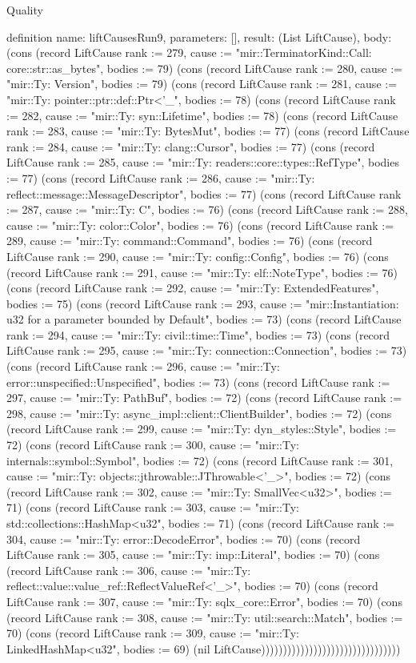\begin{lexlean}{Quality}
\begin{semanticmodule}
definition{
  name: liftCausesRun9,
  parameters: [],
  result: (List LiftCause),
  body: (cons (record LiftCause {rank := 279, cause := "mir::TerminatorKind::Call: core::str::as_bytes", bodies := 79}) (cons (record LiftCause {rank := 280, cause := "mir::Ty: Version", bodies := 79}) (cons (record LiftCause {rank := 281, cause := "mir::Ty: pointer::ptr::def::Ptr<'_", bodies := 78}) (cons (record LiftCause {rank := 282, cause := "mir::Ty: syn::Lifetime", bodies := 78}) (cons (record LiftCause {rank := 283, cause := "mir::Ty: BytesMut", bodies := 77}) (cons (record LiftCause {rank := 284, cause := "mir::Ty: clang::Cursor", bodies := 77}) (cons (record LiftCause {rank := 285, cause := "mir::Ty: readers::core::types::RefType", bodies := 77}) (cons (record LiftCause {rank := 286, cause := "mir::Ty: reflect::message::MessageDescriptor", bodies := 77}) (cons (record LiftCause {rank := 287, cause := "mir::Ty: C", bodies := 76}) (cons (record LiftCause {rank := 288, cause := "mir::Ty: color::Color", bodies := 76}) (cons (record LiftCause {rank := 289, cause := "mir::Ty: command::Command", bodies := 76}) (cons (record LiftCause {rank := 290, cause := "mir::Ty: config::Config", bodies := 76}) (cons (record LiftCause {rank := 291, cause := "mir::Ty: elf::NoteType", bodies := 76}) (cons (record LiftCause {rank := 292, cause := "mir::Ty: ExtendedFeatures", bodies := 75}) (cons (record LiftCause {rank := 293, cause := "mir::Instantiation: u32 for a parameter bounded by Default", bodies := 73}) (cons (record LiftCause {rank := 294, cause := "mir::Ty: civil::time::Time", bodies := 73}) (cons (record LiftCause {rank := 295, cause := "mir::Ty: connection::Connection", bodies := 73}) (cons (record LiftCause {rank := 296, cause := "mir::Ty: error::unspecified::Unspecified", bodies := 73}) (cons (record LiftCause {rank := 297, cause := "mir::Ty: PathBuf", bodies := 72}) (cons (record LiftCause {rank := 298, cause := "mir::Ty: async_impl::client::ClientBuilder", bodies := 72}) (cons (record LiftCause {rank := 299, cause := "mir::Ty: dyn_styles::Style", bodies := 72}) (cons (record LiftCause {rank := 300, cause := "mir::Ty: internals::symbol::Symbol", bodies := 72}) (cons (record LiftCause {rank := 301, cause := "mir::Ty: objects::jthrowable::JThrowable<'_>", bodies := 72}) (cons (record LiftCause {rank := 302, cause := "mir::Ty: SmallVec<u32>", bodies := 71}) (cons (record LiftCause {rank := 303, cause := "mir::Ty: std::collections::HashMap<u32", bodies := 71}) (cons (record LiftCause {rank := 304, cause := "mir::Ty: error::DecodeError", bodies := 70}) (cons (record LiftCause {rank := 305, cause := "mir::Ty: imp::Literal", bodies := 70}) (cons (record LiftCause {rank := 306, cause := "mir::Ty: reflect::value::value_ref::ReflectValueRef<'_>", bodies := 70}) (cons (record LiftCause {rank := 307, cause := "mir::Ty: sqlx_core::Error", bodies := 70}) (cons (record LiftCause {rank := 308, cause := "mir::Ty: util::search::Match", bodies := 70}) (cons (record LiftCause {rank := 309, cause := "mir::Ty: LinkedHashMap<u32", bodies := 69}) (nil LiftCause))))))))))))))))))))))))))))))))
}


\end{semanticmodule}
\end{lexlean}
